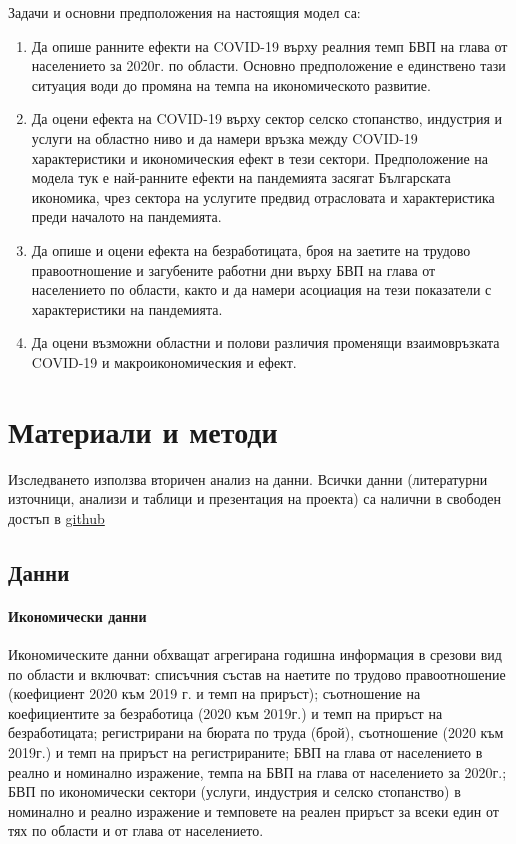 \documentclass[a4paper,12pt]{article}
\begin{document}
Задачи и основни предположения на настоящия модел са:
\begin{enumerate}
\item Да опише ранните ефекти на COVID-19 върху реалния темп БВП на глава от населението за 2020г. по области. Основно предположение е единствено тази ситуация води до промяна на темпа на икономическото развитие. 
\item Да оцени ефекта на COVID-19 върху сектор селско стопанство, индустрия и услуги на областно ниво и да намери връзка между COVID-19 характеристики и икономическия ефект в тези сектори. Предположение на модела тук е най-ранните ефекти на пандемията засягат Българската икономика, чрез сектора на услугите предвид отрасловата и характеристика преди началото на пандемията. 
\item  Да опише и оцени ефекта на безработицата, броя на заетите на трудово правоотношение и загубените работни дни върху БВП на глава от населението по области, както и да намери асоциация на тези показатели с характеристики на пандемията.
\item Да оцени възможни областни и полови различия променящи взаимовръзката COVID-19 и макроикономическия и ефект.
\end{enumerate}

\section{Материали и методи}
Изследването използва вторичен анализ на данни. Всички данни (литературни източници, анализи и таблици и презентация на проекта) са налични в свободен достъп в \href{https://github.com/kostadinoff/macroeconomics_SU_project.git}{github}  
\subsection{Данни}

\paragraph{Икономически данни}
Икономическите данни обхващат агрегирана годишна информация в срезови вид по области и включват: списъчния състав на наетите по трудово правоотношение (коефициент 2020 към 2019 г. и темп на приръст); съотношение на коефициентите за безработица (2020 към 2019г.) и темп на приръст на безработицата; регистрирани на бюрата по труда (брой), съотношение (2020 към 2019г.) и темп на приръст на регистрираните; БВП на глава от населението в реално и номинално изражение, темпа на БВП на глава от населението за 2020г.; БВП по икономически сектори (услуги, индустрия и селско стопанство) в номинално и реално изражение и темповете на реален приръст за всеки един от тях по области и от глава от населението. 
\end{document}
